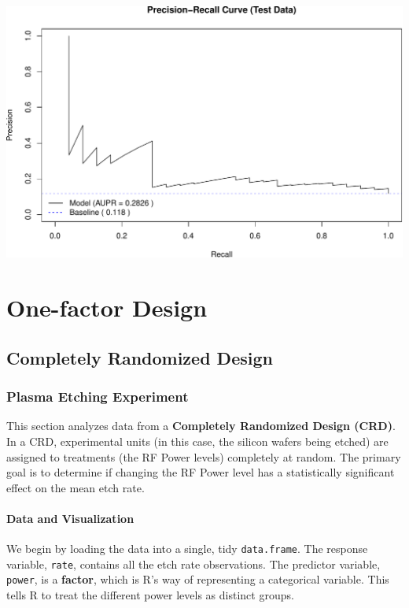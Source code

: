 \documentclass[
  letterpaper,
]{scrbook}
\begin{document}
\includegraphics{unit4-lr/logistic_files/figure-pdf/pr-curve-rocr-chd-1.pdf}


\chapter{One-factor Design}\label{one-factor-design}

\section{Completely Randomized
Design}\label{completely-randomized-design}

\subsection{Plasma Etching Experiment}\label{plasma-etching-experiment}

This section analyzes data from a \textbf{Completely Randomized Design
(CRD)}. In a CRD, experimental units (in this case, the silicon wafers
being etched) are assigned to treatments (the RF Power levels)
completely at random. The primary goal is to determine if changing the
RF Power level has a statistically significant effect on the mean etch
rate.

\subsubsection{Data and Visualization}\label{data-and-visualization}

We begin by loading the data into a single, tidy \texttt{data.frame}.
The response variable, \texttt{rate}, contains all the etch rate
observations. The predictor variable, \texttt{power}, is a
\textbf{factor}, which is R's way of representing a categorical
variable. This tells R to treat the different power levels as distinct
groups.
\end{document}
